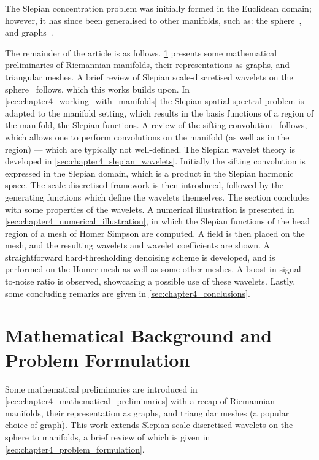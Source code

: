 The Slepian concentration problem was initially formed in the Euclidean domain; however, it has since been generalised to other manifolds, such as: the sphere~\cite{Simons2006,Wieczorek2005,Albertella1999,Cohen1989,Meaney1984,Daubechies1988}, and graphs~\cite{VanDeVille2017,VanDeVille2017a,Bolton2018}.

The remainder of the article is as follows.
\cref{sec:chapter4_mathematical_background_problem_formulation} presents some mathematical preliminaries of Riemannian manifolds, their representations as graphs, and triangular meshes.
A brief review of Slepian scale-discretised wavelets on the sphere~\cite{Roddy2021a} follows, which this works builds upon.
In \cref{sec:chapter4_working_with_manifolds} the Slepian spatial-spectral problem is adapted to the manifold setting, which results in the basis functions of a region of the manifold, the Slepian functions.
A review of the sifting convolution~\cite{Roddy2021} follows, which allows one to perform convolutions on the manifold (as well as in the region) --- which are typically not well-defined.
The Slepian wavelet theory is developed in \cref{sec:chapter4_slepian_wavelets}.
Initially the sifting convolution is expressed in the Slepian domain, which is a product in the Slepian harmonic space.
The scale-discretised framework is then introduced, followed by the generating functions which define the wavelets themselves.
The section concludes with some properties of the wavelets.
A numerical illustration is presented in \cref{sec:chapter4_numerical_illustration}, in which the Slepian functions of the head region of a mesh of Homer Simpson are computed.
A field is then placed on the mesh, and the resulting wavelets and wavelet coefficients are shown.
A straightforward hard-thresholding denoising scheme is developed, and is performed on the Homer mesh as well as some other meshes.
A boost in signal-to-noise ratio is observed, showcasing a possible use of these wavelets.
Lastly, some concluding remarks are given in \cref{sec:chapter4_conclusions}.

\section{Mathematical Background and Problem Formulation}\label{sec:chapter4_mathematical_background_problem_formulation}

Some mathematical preliminaries are introduced in \cref{sec:chapter4_mathematical_preliminaries} with a recap of Riemannian manifolds, their representation as graphs, and triangular meshes (a popular choice of graph).
This work extends Slepian scale-discretised wavelets on the sphere to manifolds, a brief review of which is given in \cref{sec:chapter4_problem_formulation}.

